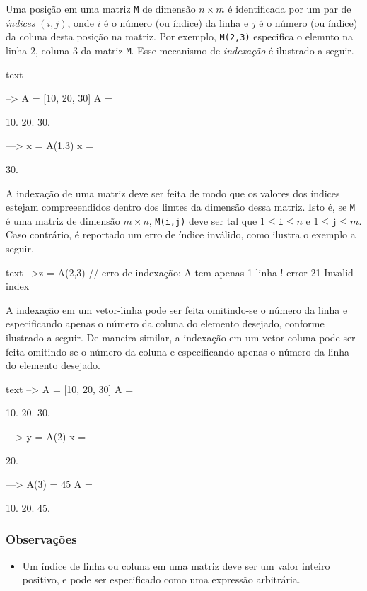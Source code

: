 \documentclass[11pt]{practice}
\begin{document}
Uma posição em uma matriz \texttt{M} de dimensão $n\times m$ é
identificada por um par de \emph{índices} $(i,j)$, onde $i$ é o número
(ou índice) da linha e $j$ é o número (ou índice) da coluna desta
posição na matriz. Por exemplo, \texttt{M(2,3)} especifica o elemnto na
linha 2, coluna 3 da matriz \texttt{M}. Esse mecanismo de
\emph{indexação} é ilustrado a seguir.

\begin{lst}{text}

--> A = [10, 20, 30]
 A  =
 
     10.     20.      30.

---> x = A(1,3)        
 x = 

     30.

\end{lst}

A indexação de uma matriz deve ser feita de modo que os valores dos
índices estejam compreeendidos dentro dos limtes da dimensão dessa
matriz. Isto é, se \texttt{M} é uma matriz de dimensão $m\times n$,
\texttt{M(i,j)} deve ser tal que $1 \leq \texttt{i} \leq n$ e
$1 \leq \texttt{j} \leq m$. Caso contrário, é reportado um erro de
índice inválido, como ilustra o exemplo a seguir.

\begin{lst}{text}
-->z = A(2,3)           // erro de indexação: A tem apenas 1 linha
               ! error 21
Invalid index
\end{lst}

A indexação em um vetor-linha pode ser feita omitindo-se o número da
linha e especificando apenas o número da coluna do elemento desejado,
conforme ilustrado a seguir. De maneira similar, a indexação em um
vetor-coluna pode ser feita omitindo-se o número da coluna e
especificando apenas o número da linha do elemento desejado.

\begin{lst}{text}
--> A = [10, 20, 30]
 A  =
 
     10.     20.      30.

---> y = A(2)          
 x = 

     20. 


---> A(3) = 45      
A  =
 
     10.     20.      45.
\end{lst}

\subsubsection*{Observações}
\begin{itemize}
  \item Um índice de linha ou coluna em uma matriz deve ser um valor
  inteiro positivo, e pode ser especificado como uma expressão
  arbitrária.
\end{itemize}  
\end{document}
